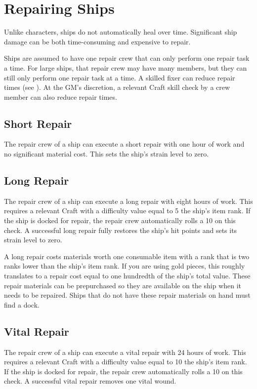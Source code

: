 \section{Repairing Ships}
  Unlike characters, ships do not automatically heal over time.
  Significant ship damage can be both time-consuming and expensive to repair.

  Ships are assumed to have one repair crew that can only perform one repair task a time.
  For large ships, that repair crew may have many members, but they can still only perform one repair task at a time.
  A skilled fixer can reduce repair times (see ).
  At the GM's discretion, a relevant Craft skill check by a crew member can also reduce repair times.

  \subsection{Short Repair}
    The repair crew of a ship can execute a short repair with one hour of work and no significant material cost.
    This sets the ship's strain level to zero.

  \subsection{Long Repair}
    The repair crew of a ship can execute a long repair with eight hours of work.
    This requires a relevant Craft  with a difficulty value equal to 5 \add the ship's item rank.
    If the ship is docked for repair, the repair crew automatically rolls a 10 on this check.
    A successful long repair fully restores the ship's hit points and sets its strain level to zero.

    A long repair costs materials worth one consumable item with a rank that is two ranks lower than the ship's item rank.
    If you are using gold pieces, this roughly translates to a repair cost equal to one hundredth of the ship's total value.
    These repair materials can be prepurchased so they are available on the ship when it needs to be repaired.
    Ships that do not have these repair materials on hand must find a dock.

  \subsection{Vital Repair}
    The repair crew of a ship can execute a vital repair with 24 hours of work.
    This requires a relevant Craft  with a difficulty value equal to 10 \add the ship's item rank.
    If the ship is docked for repair, the repair crew automatically rolls a 10 on this check.
    A successful vital repair removes one vital wound.


